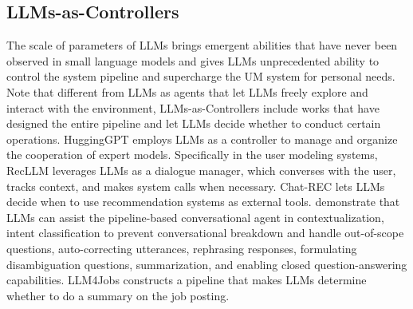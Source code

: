 \documentclass[11pt]{article}
\newcommand{\edit}[1]{\textcolor{blue}{#1}}
\newcommand{\comments}[1]{\textcolor{red}{[Re:~#1]}}
\begin{document}
\subsection{LLMs-as-Controllers}
\label{sec:approach_controller}
The scale of parameters of LLMs brings emergent abilities that have never been observed in small language models and gives LLMs unprecedented ability to control the system pipeline and supercharge the UM system for personal needs. Note that different from LLMs as agents that let LLMs freely explore and interact with the environment, LLMs-as-Controllers include works that have designed the entire pipeline and let LLMs decide whether to conduct certain operations.
HuggingGPT \cite{shen2023hugginggpt} employs LLMs as a controller to manage and organize the cooperation of expert models. Specifically in the user modeling systems, RecLLM \cite{friedman2023leveraging} leverages LLMs as a dialogue manager, which converses with the user, tracks context, and makes system calls when necessary. Chat-REC \cite{gao2023chat} lets LLMs decide when to use recommendation systems as external tools. \citet{foosherian2023enhancing} demonstrate that LLMs can assist the pipeline-based conversational agent in contextualization, intent classification to prevent conversational breakdown and handle out-of-scope questions, auto-correcting utterances, rephrasing responses, formulating disambiguation questions, summarization, and enabling closed question-answering capabilities. LLM4Jobs \cite{li2023llm4jobs} constructs a pipeline that makes LLMs determine whether to do a summary on the job posting. 
\end{document}
